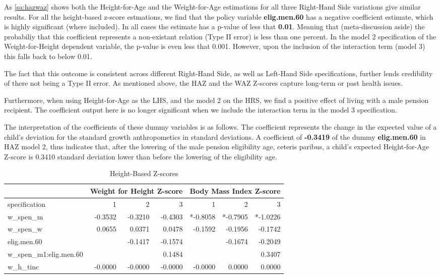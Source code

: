 \begin{refsection}
As \autoref{sa:hazwaz} shows both the Height-for-Age and the Weight-for-Age estimations for all three Right-Hand Side variations give similar results.
For all the height-based z-score estmations, we find that the policy variable \textbf{elig.men.60} has a negative coefficient estimate, which is highly significant (where included).
In all cases the estimate has a p-value of less that \textbf{0.01}.
Meaning that (meta-discussion aside) the probabiliy that this coefficient represents a non-existant relation (Type II error) is less than one percent.
In the model 2 specification of the Weight-for-Height dependent variable, the p-value is even less that 0.001.
However, upon the inclusion of the interaction term (model 3) this falls back to below 0.01.

The fact that this outcome is consistent across different Right-Hand Side,
as well as Left-Hand Side specifications, further lends credibility of there not being a Type II error.
As mentioned above, the HAZ and the WAZ Z-scores capture long-term or past health issues.

Furthermore, when using Height-for-Age as the LHS, and the model 2 on the HRS, we find a positive effect of living with a male pension recipient.
The coefficient output here is no longer significant when we include the interaction term in the model 3 specification.

The interpretation of the coefficients of these dummy variables is as follows.
The coefficient represents the change in the expected value of a child's deviation for the standard growth anthropometics in standard deviations. 
A coefficient of \textbf{-0.3419} of the dummy \textbf{elig.men.60} in HAZ model 2,  thus indicates that,
after the lowering of the male pension eligibility age, ceteris paribus, a child's expected Height-for-Age Z-score is 0.3410 standard deviation lower than before the lowering of the eligibility age.


\begin{table}[!ht]
\centering
\caption{Height-Based Z-scores}
\label{sa:whzbmiz}
\begin{tabular}{l|rrr|rrr}
& \multicolumn{3}{c}{Weight for Height Z-score} & \multicolumn{3}{c}{Body Mass Index Z-score}\\
\hline
specification & 1 & 2 & 3 & 1 & 2 & 3 \\
\hline
w\_spen\_m &  -0.3532 & -0.3210 & -0.4303 & *-0.8058 & *-0.7905 & *-1.0226 \\
w\_spen\_w & 0.0655 & 0.0371 & 0.0478 & -0.1592 & -0.1956 & -0.1742 \\
elig.men.60 & & -0.1417 & -0.1574 & & -0.1674 & -0.2049 \\
w\_spen\_m1:elig.men.60 & & & 0.1484 & & & 0.3407 \\
w\_h\_tinc & -0.0000 & -0.0000 & -0.0000 & -0.0000 & 0.0000 & 0.0000
\end{tabular}
\end{table}


\end{refsection}
